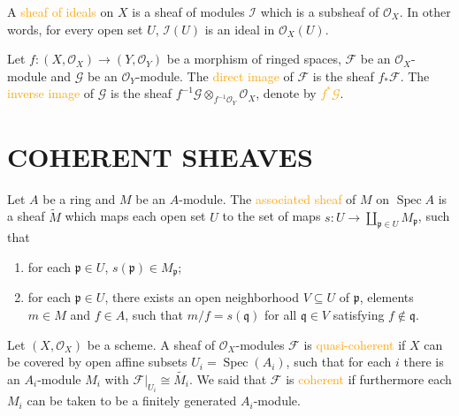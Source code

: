 \begin{definition}
	A \textcolor{orange}{sheaf of ideals} on $X$ is a sheaf of modules $\mathcal{I}$ which is a subsheaf of $\mathcal{O}_X$. In other words, for every open set $U$, $\mathcal{I}(U)$ is an ideal in $\mathcal{O}_X(U)$.
\end{definition}

\begin{definition}
	Let $f:\left(X,\mathcal{O}_X\right)\rightarrow\left(Y,\mathcal{O}_Y\right)$ be a morphism of ringed spaces, $\mathcal{F}$ be an $\mathcal{O}_X$-module and $\mathcal{G}$ be an $\mathcal{O}_Y$-module.	The \textcolor{orange}{direct image} of $\mathcal{F}$ is the sheaf $f_*\mathcal{F}$. The \textcolor{orange}{inverse image} of $\mathcal{G}$ is the sheaf $f^{-1}\mathcal{G}\otimes_{f^{-1}\mathcal{O}_Y}\mathcal{O}_X$, denote by \textcolor{orange}{$f^*\mathcal{G}$}.
\end{definition}

\section*{COHERENT SHEAVES}

\begin{definition}
	Let $A$ be a ring and $M$ be an $A$-module. The \textcolor{orange}{associated sheaf} of $M$ on $\operatorname{Spec}A$ is a sheaf $\tilde{M}$ which maps each open set $U$ to the set of maps $s:U\rightarrow\coprod_{\mathfrak{p}\in U}M_\mathfrak{p}$, such that
	\begin{enumerate}[label=\textup{(\arabic*)}]
		\item for each $\mathfrak{p}\in U$, $s(\mathfrak{p})\in M_\mathfrak{p}$;
		\item for each $\mathfrak{p}\in U$, there exists an open neighborhood $V\subseteq U$ of $\mathfrak{p}$, elements $m\in M$ and $f\in A$, such that $m/f=s(\mathfrak{q})$ for all $\mathfrak{q}\in V$ satisfying $f\notin\mathfrak{q}$.
	\end{enumerate}
\end{definition}

\begin{definition}
	Let $\left(X,\mathcal{O}_X\right)$ be a scheme. A sheaf of $\mathcal{O}_X$-modules $\mathcal{F}$ is \textcolor{orange}{quasi-coherent} if $X$ can be covered by open affine subsets $U_i=\operatorname{Spec}\!\left(A_i\right)$, such that for each $i$ there is an $A_i$-module $M_i$ with $\mathcal{F}|_{U_i}\cong\tilde{M_i}$. We said that $\mathcal{F}$ is \textcolor{orange}{coherent} if furthermore each $M_i$ can be taken to be a finitely generated $A_i$-module.
\end{definition}

